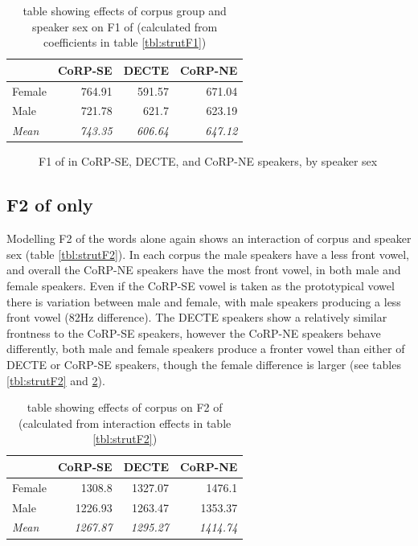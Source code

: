 \documentclass[../../../00.FullDoc/tex/ThesisSkeleton-draft2]{subfiles}
\begin{document}
\begin{table}[htbp]
	\centering
	\begin{tabular}{lrrr}
		\hline
		& \multicolumn{1}{l}{CoRP-SE} & \multicolumn{1}{l}{DECTE} & \multicolumn{1}{l}{CoRP-NE} \\
		\hline
		Female & 764.91 & 591.57 & 671.04 \\
		Male  & 721.78 & 621.7 & 623.19 \\
		\textit{Mean} & \textit{743.35} & \textit{606.64} & \textit{647.12} \\
		\hline
	\end{tabular}%
	\caption{table showing effects of corpus group and speaker sex on F1 of \strutt{} (calculated from coefficients in table \ref{tbl:strutF1})}
	\label{tbl:strutF1inter}%
\end{table}%

\begin{figure}[h]
	
	\caption{F1 of \strutt{} in CoRP-SE, DECTE, and CoRP-NE speakers, by speaker sex} \label{fig:strutF1-sex}
\end{figure}


\subsection{F2 of  only}
Modelling F2 of the \strutt{} words alone again shows an interaction of corpus and speaker sex (table \ref{tbl:strutF2}). In each corpus the male speakers have a less front vowel, and overall the CoRP-NE speakers have the most front vowel, in both male and female speakers. Even if the CoRP-SE vowel is taken as the prototypical \strutt{} vowel there is variation between male and female, with male speakers producing a less front vowel (82Hz difference). The DECTE speakers show a relatively similar frontness to the CoRP-SE speakers, however the CoRP-NE speakers behave differently, both male and female speakers produce a fronter \strutt{} vowel than either of DECTE or CoRP-SE speakers, though the female difference is larger (see tables \ref{tbl:strutF2} and \ref{tbl:strutF2-inter}).


\begin{table}[htbp]
	\centering
	\begin{tabular}{lrrr}
		\hline
		& \multicolumn{1}{l}{CoRP-SE} & \multicolumn{1}{l}{DECTE} & \multicolumn{1}{l}{CoRP-NE} \\
		\hline
		Female & 1308.8 & 1327.07 & 1476.1 \\
		Male  & 1226.93 & 1263.47 & 1353.37 \\
		\textit{Mean} & \textit{1267.87} & \textit{1295.27} & \textit{1414.74} \\
		\hline
	\end{tabular}%
	\caption{table showing effects of corpus on F2 of \strutt{} (calculated from interaction effects in table \ref{tbl:strutF2})}
	\label{tbl:strutF2-inter}%
\end{table}%
\end{document}
